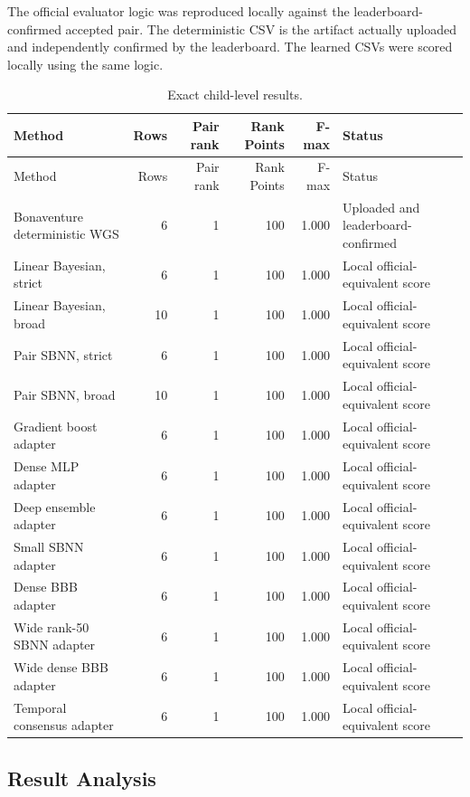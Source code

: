 \documentclass[11pt]{article}
\begin{document}
The official evaluator logic was reproduced locally against the leaderboard-confirmed accepted pair. The deterministic CSV is the artifact actually uploaded and independently confirmed by the leaderboard. The learned CSVs were scored locally using the same logic.

\begin{longtable}{p{}rrrrp{}}
\caption{Exact child-level results.}\\
\toprule
Method & Rows & Pair rank & Rank Points & F-max & Status \\
\midrule
\endfirsthead
\toprule
Method & Rows & Pair rank & Rank Points & F-max & Status \\
\midrule
\endhead
Bonaventure deterministic WGS & 6 & 1 & 100 & 1.000 & Uploaded and leaderboard-confirmed \\
Linear Bayesian, strict & 6 & 1 & 100 & 1.000 & Local official-equivalent score \\
Linear Bayesian, broad & 10 & 1 & 100 & 1.000 & Local official-equivalent score \\
Pair SBNN, strict & 6 & 1 & 100 & 1.000 & Local official-equivalent score \\
Pair SBNN, broad & 10 & 1 & 100 & 1.000 & Local official-equivalent score \\
Gradient boost adapter & 6 & 1 & 100 & 1.000 & Local official-equivalent score \\
Dense MLP adapter & 6 & 1 & 100 & 1.000 & Local official-equivalent score \\
Deep ensemble adapter & 6 & 1 & 100 & 1.000 & Local official-equivalent score \\
Small SBNN adapter & 6 & 1 & 100 & 1.000 & Local official-equivalent score \\
Dense BBB adapter & 6 & 1 & 100 & 1.000 & Local official-equivalent score \\
Wide rank-50 SBNN adapter & 6 & 1 & 100 & 1.000 & Local official-equivalent score \\
Wide dense BBB adapter & 6 & 1 & 100 & 1.000 & Local official-equivalent score \\
Temporal consensus adapter & 6 & 1 & 100 & 1.000 & Local official-equivalent score \\
\bottomrule
\end{longtable}
\subsection{Result Analysis}
\end{document}
